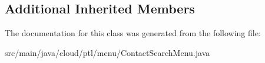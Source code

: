 \subsection*{Additional Inherited Members}


The documentation for this class was generated from the following file\+:\begin{DoxyCompactItemize}
\item 
src/main/java/cloud/ptl/menu/Contact\+Search\+Menu.\+java\end{DoxyCompactItemize}
